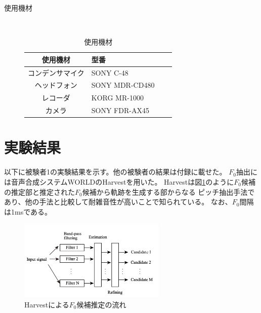 \documentclass[10.5ptj,a4j,dvipdfmx,uplatex, oneside, openany, report, draft]{jsbook}%
\begin{document}
\begin{description}
    \item[使用機材]\mbox{}\\
        \begin{table}[h]
            \caption{使用機材}
            \label{table:items}
            \centering
            \begin{tabular}{clll}
                \hline
                使用機材 & 型番 \\
                \hline \hline
                コンデンサマイク & SONY C-48\\
                ヘッドフォン & SONY MDR-CD480\\
                レコーダ & KORG MR-1000\\
                カメラ & SONY FDR-AX45\\
                \hline
            \end{tabular}
        \end{table}
        
\end{description}








\section{実験結果}
以下に被験者1の実験結果を示す。他の被験者の結果は付録に載せた。
$F_0$抽出には音声合成システムWORLD\cite{world}のHarvest\cite{harvest}を用いた。
Harvestは図\ref{harvest}のように$F_0$候補の推定部と推定された$F_0$候補から軌跡を生成する部からなる
ピッチ抽出手法であり、他の手法と比較して耐雑音性が高いことで知られている。
なお、$F_0$間隔は1msである。

\begin{figure}[htbp]
    \begin{center}
      \includegraphics[clip,width=7.0cm]{harvest.png}
      \caption{Harvestによる$F_0$候補推定の流れ\cite{harvest}}
      \label{harvest}
    \end{center}
\end{figure}
\end{document}
